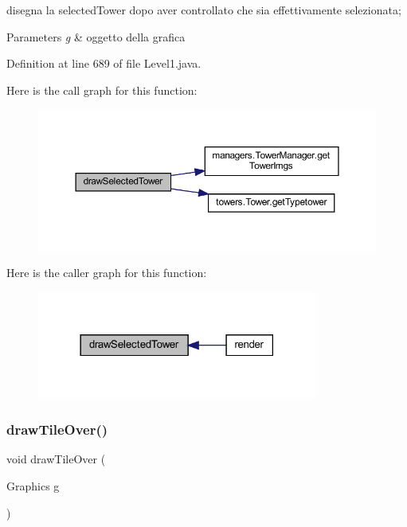 disegna la selected\+Tower dopo aver controllato che sia effettivamente selezionata; 


\begin{DoxyParams}{Parameters}
{\em g} & oggetto della grafica \\
\hline
\end{DoxyParams}


Definition at line 689 of file Level1.\+java.

Here is the call graph for this function\+:
\nopagebreak
\begin{figure}[H]
\begin{center}
\leavevmode
\includegraphics[width=350pt]{classscenes_1_1_level1_a0a97d0bb6d32640b2ae351707946abf7_cgraph}
\end{center}
\end{figure}
Here is the caller graph for this function\+:\nopagebreak
\begin{figure}[H]
\begin{center}
\leavevmode
\includegraphics[width=261pt]{classscenes_1_1_level1_a0a97d0bb6d32640b2ae351707946abf7_icgraph}
\end{center}
\end{figure}
\mbox{\label{classscenes_1_1_level1_ac299bbbbb70f97ae032c1345d5937378}} 
\subsubsection{\texorpdfstring{draw\+Tile\+Over()}{drawTileOver()}}
{\footnotesize\ttfamily void draw\+Tile\+Over (\begin{DoxyParamCaption}\item[{Graphics}]{g }\end{DoxyParamCaption})\hspace{0.3cm}{\ttfamily [private]}}



